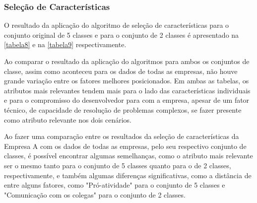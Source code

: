\subsubsection{Seleção de Características}
O resultado da aplicação do algoritmo de seleção de características para o conjunto original de 5 classes e para o conjunto de 2 classes é apresentado na \autoref{tabela8} e na \autoref{tabela9} respectivamente.

Ao comparar o resultado da aplicação do algoritmos para ambos os conjuntos de classe, assim como aconteceu para os dados de todas as empresas, não houve grande variação entre os fatores melhores posicionados. Em ambas as tabelas, os atributos mais relevantes tendem mais para o lado das características individuais e para o compromisso do desenvolvedor para com a empresa, apesar de um fator técnico, de capacidade de resolução de problemas complexos, se fazer presente como atributo relevante nos dois cenários.

Ao fazer uma comparação entre os resultados da seleção de características da Empresa A com os dados de todas as empresas, pelo seu respectivo conjunto de classes, é possível encontrar algumas semelhanças, como o atributo mais relevante ser o mesmo tanto para o conjunto de 5 classes quanto para o de 2 classes, respectivamente, e também algumas diferenças significativas, como a distância de entre alguns fatores, como "Pró-atividade" para o conjunto de 5 classes e "Comunicação com os colegas" para o conjunto de 2 classes.


